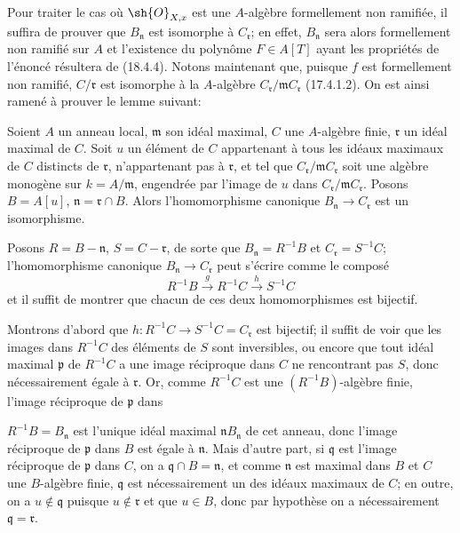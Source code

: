 Pour traiter le cas où $\sh{O}_{X,x}$ est une $A$-algèbre formellement non ramifiée, il suffira de prouver que $B_{\mathfrak n}$ est isomorphe à $C_{\mathfrak r}$; en effet, $B_{\mathfrak n}$ sera alors formellement non ramifié sur $A$ et l'existence du polynôme $F\in A[T]$ ayant les propriétés de l'énoncé résultera de (18.4.4). Notons maintenant que, puisque $f$ est formellement non ramifié, $C/\mathfrak r$ est isomorphe à la $A$-algèbre $C_{\mathfrak r}/\mathfrak mC_{\mathfrak r}$ (17.4.1.2). On est ainsi ramené à prouver le lemme suivant:

\begin{lemma}[18.4.6.1]
\label{IV.18.4.6.1}
Soient $A$ un anneau local, $\mathfrak m$ son idéal maximal, $C$ une $A$-algèbre finie, $\mathfrak r$ un idéal maximal de $C$. Soit $u$ un élément de $C$ appartenant à tous les idéaux maximaux de $C$ distincts de $\mathfrak r$, n'appartenant pas à $\mathfrak r$, et tel que $C_{\mathfrak r}/\mathfrak mC_{\mathfrak r}$ soit une algèbre monogène sur $k=A/\mathfrak m$, engendrée par l'image de $u$ dans $C_{\mathfrak r}/\mathfrak mC_{\mathfrak r}$. Posons $B=A[u]$, $\mathfrak n=\mathfrak r\cap B$. Alors l'homomorphisme canonique $B_{\mathfrak n}\to C_{\mathfrak r}$ est un isomorphisme.
\end{lemma}

Posons $R=B-\mathfrak n$, $S=C-\mathfrak r$, de sorte que $B_{\mathfrak n}=R^{-1}B$ et $C_{\mathfrak r}=S^{-1}C$; l'homomorphisme canonique $B_{\mathfrak n}\to C_{\mathfrak r}$ peut s'écrire comme le composé
\[
  R^{-1}B\xrightarrow{g}R^{-1}C\xrightarrow{h}S^{-1}C
\]
et il suffit de montrer que chacun de ces deux homomorphismes est bijectif.

Montrons d'abord que $h:R^{-1}C\to S^{-1}C=C_{\mathfrak r}$ est bijectif; il suffit de voir que les images dans $R^{-1}C$ des éléments de $S$ sont inversibles, ou encore que tout idéal maximal $\mathfrak p$ de $R^{-1}C$ a une image réciproque dans $C$ ne rencontrant pas $S$, donc nécessairement égale à $\mathfrak r$. Or, comme $R^{-1}C$ est une $(R^{-1}B)$-algèbre finie, l'image réciproque de $\mathfrak p$ dans


$R^{-1}B=B_{\mathfrak n}$ est l'unique idéal maximal $\mathfrak nB_{\mathfrak n}$ de cet anneau, donc l'image réciproque de $\mathfrak p$ dans $B$ est égale à $\mathfrak n$. Mais d'autre part, si $\mathfrak q$ est l'image réciproque de $\mathfrak p$ dans $C$, on a $\mathfrak q\cap B=\mathfrak n$, et comme $\mathfrak n$ est maximal dans $B$ et $C$ une $B$-algèbre finie, $\mathfrak q$ est nécessairement un des idéaux maximaux de $C$; en outre, on a $u\notin\mathfrak q$ puisque $u\notin\mathfrak r$ et que $u\in B$, donc par hypothèse on a nécessairement $\mathfrak q=\mathfrak r$.

